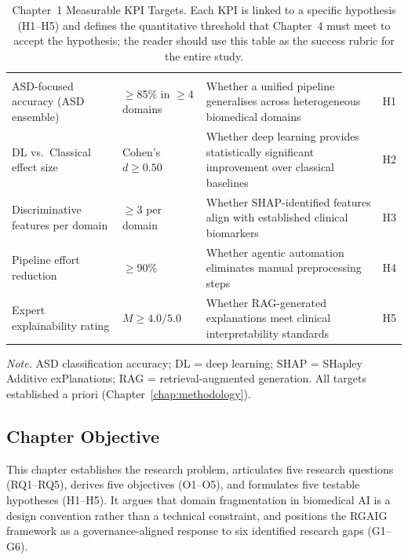 {\tablestripes\tablefontsize
\begin{xltabular}{\textwidth}{@{} >{\raggedright\arraybackslash}p{3cm} >{\raggedright\arraybackslash}p{2.2cm} L >{\raggedright\arraybackslash}p{1.2cm} @{}}
\caption[Chapter~1 Measurable KPI Targets]{Chapter~1 Measurable KPI Targets. Each KPI is linked to a specific hypothesis (H1--H5) and defines the quantitative threshold that Chapter~4 must meet to accept the hypothesis; the reader should use this table as the success rubric for the entire study.}\label{tab:ch1_kpi_targets} \\
\toprule
{} &  &  &  \\
\midrule
\endfirsthead
\toprule
{} &  &  &  \\
\midrule
\endhead
\bottomrule
\endlastfoot
ASD-focused accuracy (ASD ensemble) & $\geq$85\% in $\geq$4 domains & Whether a unified pipeline generalises across heterogeneous biomedical domains & H1 \\
\addlinespace
DL vs.\ Classical effect size & Cohen's $d \geq 0.50$ & Whether deep learning provides statistically significant improvement over classical baselines & H2 \\
\addlinespace
Discriminative features per domain & $\geq$3 per domain & Whether SHAP-identified features align with established clinical biomarkers & H3 \\
\addlinespace
Pipeline effort reduction & $\geq$90\% & Whether agentic automation eliminates manual preprocessing steps & H4 \\
\addlinespace
Expert explainability rating & $M \geq 4.0/5.0$ & Whether RAG-generated explanations meet clinical interpretability standards & H5 \\
\end{xltabular}}
\vspace{0.5em}
\noindent\textit{Note.} ASD classification accuracy; DL = deep learning; SHAP = SHapley Additive exPlanations; RAG = retrieval-augmented generation. All targets established a priori (Chapter~\ref{chap:methodology}).

\subsection{Chapter Objective}

This chapter establishes the research problem, articulates five research questions (RQ1--RQ5), derives five objectives (O1--O5), and formulates five testable hypotheses (H1--H5). It argues that domain fragmentation in biomedical AI is a design convention rather than a technical constraint, and positions the RGAIG framework as a governance-aligned response to six identified research gaps (G1--G6).

